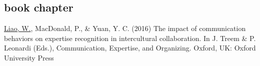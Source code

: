 \documentclass[11pt, letterpaper]{article} %
\newcommand{\years}[1]{\leavevmode\marginnote{\scriptsize #1}} %
\begin{document}

\subsection*{book chapter}
\begin{hangparas}{.25in}{1}

    \underline{Liao, W.}, \years{2016}  MacDonald, P., \& Yuan, Y. C. (2016) The impact of communication behaviors on expertise recognition in intercultural collaboration. In J. Treem \& P. Leonardi (Eds.), Communication, Expertise, and Organizing. Oxford, UK: Oxford University Press

\end{hangparas}

\end{document}
